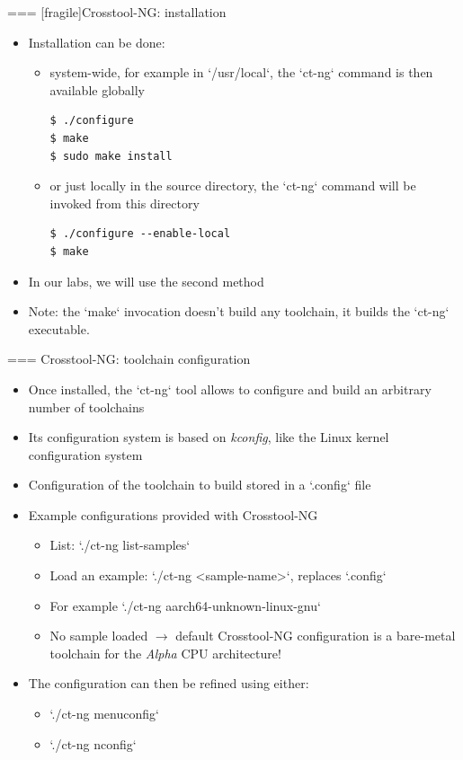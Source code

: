 === [fragile]{Crosstool-NG: installation}
  \begin{itemize}
  \item Installation can be done:
    \begin{itemize}
    \item system-wide, for example in `/usr/local`, the
      `ct-ng` command is then available globally
\begin{verbatim}
$ ./configure
$ make
$ sudo make install
\end{verbatim}
    \item or just locally in the source directory, the `ct-ng`
      command will be invoked from this directory
\begin{verbatim}
$ ./configure --enable-local
$ make
\end{verbatim}
    \end{itemize}
  \item In our labs, we will use the second method
  \item Note: the `make` invocation doesn't build any toolchain,
    it builds the `ct-ng` executable.
  \end{itemize}


=== {Crosstool-NG: toolchain configuration}
  \begin{itemize}
  \item Once installed, the `ct-ng` tool allows to configure and
    build an arbitrary number of toolchains
  \item Its configuration system is based on {\em kconfig}, like the
    Linux kernel configuration system
  \item Configuration of the toolchain to build stored in a
    `.config` file
  \item Example configurations provided with Crosstool-NG
    \begin{itemize}
    \item List: `./ct-ng list-samples`
    \item Load an example: `./ct-ng <sample-name>`, replaces `.config`
    \item For example `./ct-ng aarch64-unknown-linux-gnu`
    \item No sample loaded
      $\rightarrow$ default Crosstool-NG configuration is a bare-metal
      toolchain for the {\em Alpha} CPU architecture!
    \end{itemize}
  \item The configuration can then be refined using either:
    \begin{itemize}
    \item `./ct-ng menuconfig`
    \item `./ct-ng nconfig`
    \end{itemize}
  \end{itemize}


